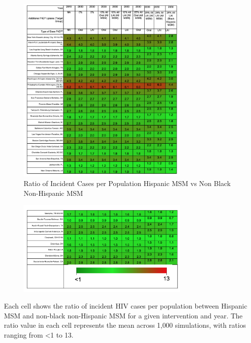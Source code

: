 \documentclass{article}
\begin{document}
\begin{figure}[H]
	\centering
	\caption{Ratio of Incident Cases per Population Hispanic MSM vs Non Black Non-Hispanic MSM}
	\includegraphics[width=0.75\textwidth]{images/FigureS6_1}
\end{figure}

\pagebreak

\begin{figure}[H]
	\centering
	\includegraphics[width=0.75\textwidth]{images/FigureS6_2}
\end{figure}

Each cell shows the ratio of incident HIV cases per population between Hispanic MSM and non-black non-Hispanic MSM for a given intervention and year. The ratio value in each cell represents the mean across 1,000 simulations, with ratios ranging from <1 to 13. 
\end{document}
